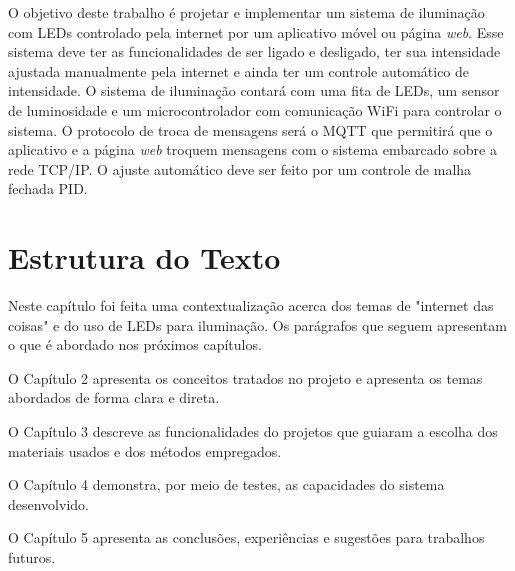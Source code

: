 O objetivo deste trabalho é projetar e implementar um sistema de iluminação com LEDs controlado pela internet por um aplicativo móvel ou página \textit{web}. Esse sistema deve ter as funcionalidades de ser ligado e desligado, ter sua intensidade ajustada manualmente pela internet e ainda ter um controle automático de intensidade. O sistema de iluminação contará com uma fita de LEDs, um sensor de luminosidade e um microcontrolador com comunicação WiFi para controlar o sistema. O protocolo de troca de mensagens será o MQTT que permitirá que o aplicativo e a página \textit{web} troquem mensagens com o sistema embarcado sobre a rede TCP/IP. O ajuste automático deve ser feito por um controle de malha fechada PID.

\section{Estrutura do Texto}

Neste capítulo foi feita uma contextualização acerca dos temas de "internet das coisas" \space e do uso de LEDs para iluminação. Os parágrafos que seguem apresentam o que é abordado nos próximos capítulos.

O Capítulo 2 apresenta os conceitos tratados no projeto e apresenta os temas abordados de forma clara e direta.

O Capítulo 3 descreve as funcionalidades do projetos que guiaram a escolha dos materiais usados e dos métodos empregados.

O Capítulo 4 demonstra, por meio de testes, as capacidades do sistema desenvolvido.

O Capítulo 5 apresenta as conclusões, experiências e sugestões para trabalhos futuros.